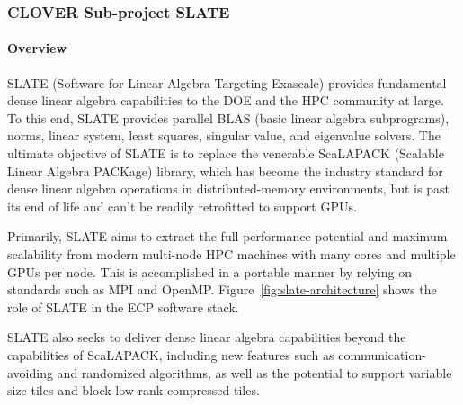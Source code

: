 \subsubsection{ CLOVER Sub-project SLATE}\label{subsubsect:slate}

\paragraph{Overview}

SLATE (Software for Linear Algebra Targeting Exascale)
provides fundamental dense linear algebra capabilities
to the DOE and the HPC community at large.
To this end, SLATE provides
parallel BLAS (basic linear algebra subprograms), norms,
linear system, least squares,
singular value, and eigenvalue solvers.
%
The ultimate objective of SLATE is to replace the
venerable ScaLAPACK (Scalable Linear Algebra PACKage) library,
which has become the industry standard for dense linear algebra operations
in distributed-memory environments, but is past its end of life
and can't be readily retrofitted to support GPUs.

Primarily, SLATE aims to extract the full performance potential and maximum
scalability from modern multi-node HPC machines with
many cores and multiple GPUs per node.
This is accomplished in a portable manner by relying on standards
such as MPI and OpenMP.
%
Figure~\ref{fig:slate-architecture} shows the role of SLATE
in the ECP software stack.

SLATE also seeks to deliver dense linear algebra capabilities
beyond the capabilities of ScaLAPACK,
including new features such as communication-avoiding
and randomized algorithms, as well as the potential to
support variable size tiles and block low-rank compressed tiles.

